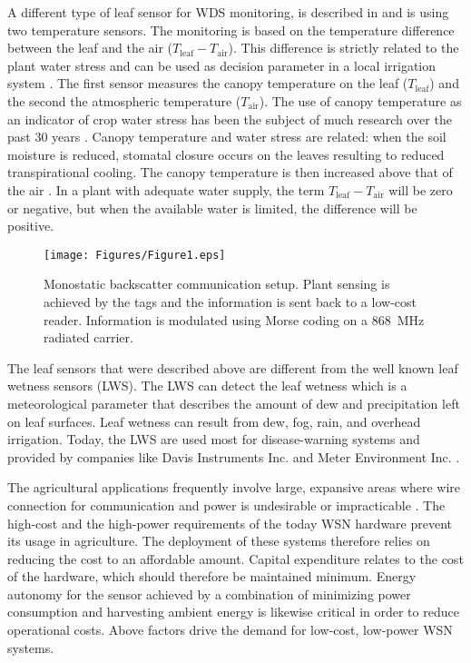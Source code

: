 \documentclass[journal]{IEEEtran}
\begin{document}
A different type of leaf sensor for WDS monitoring,  is described in \cite{palazzari2017leaf} and is using two  temperature sensors.
%
The monitoring is based on  the temperature difference between the leaf and the air ($T_\text{leaf}- T_\text{air}$). 
% 
This difference is strictly related to the plant water stress and can be used as decision parameter in a  local irrigation system \cite{abraham2000irrigation}.
%
The first sensor measures the canopy temperature on  the leaf ($T_\text{leaf}$)  and the second the atmospheric temperature ($T_\text{air}$).
%
The use of canopy temperature as an indicator of crop water stress has been the subject of much research over the past $30$ years \cite{patel2001canopy}.
%
Canopy temperature and water stress are related: 
when the soil moisture is reduced,   stomatal closure occurs on the leaves resulting to reduced   transpirational cooling. 
%
The canopy temperature is then increased above that of the air
\cite{pearcy1971photosynthetic}.
%
In a plant with adequate water supply, the term  $T_\text{leaf}- T_\text{air}$ will be zero or negative, but
when the available water is limited, the difference will be
positive.

\begin{figure}[t]
\centering
\texttt{[image: Figures/Figure1.eps]}
\caption{Monostatic backscatter communication setup. Plant sensing is achieved by the tags and the information is sent back to a low-cost reader. Information is modulated using Morse coding on a $868$~MHz radiated carrier.}
\label{fig:backscatterlogic}
\end{figure}
The leaf sensors that were described above   are different from the well known leaf wetness  sensors (LWS).
%
The LWS can  detect the leaf wetness which is a meteorological parameter that describes the amount of dew and precipitation left on leaf surfaces. 
%
Leaf wetness can result from dew, fog, rain, and overhead irrigation.
%
Today, the LWS   are used most for  disease-warning systems 
\cite{hornero2017novel} and provided by companies like Davis Instruments Inc. and Meter Environment  Inc. \cite{PHYTOS-31}. 


The agricultural applications frequently involve large, expansive areas where wire connection for communication and power is undesirable or impracticable \cite{ruiz2009review}. 
%
The high-cost and the high-power requirements of the today WSN hardware prevent its usage in agriculture.
%
The deployment of these systems therefore relies  on reducing the cost to an affordable amount. 
%
Capital expenditure relates to the cost of the hardware, which should therefore be maintained minimum.
%
Energy autonomy for the sensor achieved by a combination of minimizing power consumption and harvesting ambient energy is likewise critical in order to reduce operational costs. 
%
Above factors drive the demand for low-cost, low-power WSN systems.
\end{document}
